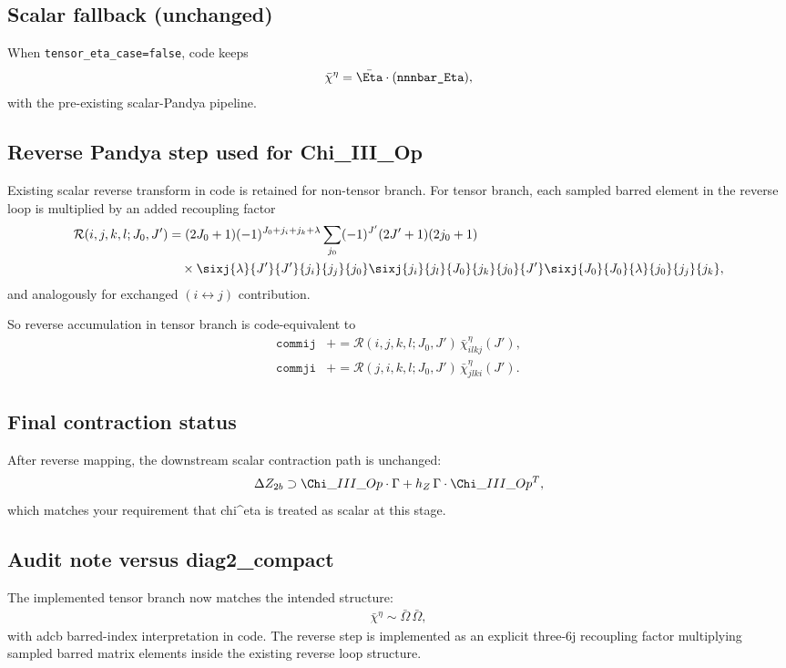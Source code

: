 \subsection*{Scalar fallback (unchanged)}
When \texttt{tensor\_eta\_case=false}, code keeps
\begin{align}
\bar\chi^{\eta} = \bar\Eta\cdot (\texttt{nnnbar\_Eta}),
\end{align}
with the pre-existing scalar-Pandya pipeline.

\subsection*{Reverse Pandya step used for Chi\_III\_Op}
Existing scalar reverse transform in code is retained for non-tensor branch.
For tensor branch, each sampled barred element in the reverse loop is multiplied by
an added recoupling factor
\begin{align}
\mathcal R(i,j,k,l;J_0,J')
&= (2J_0+1)(-1)^{J_0 + j_i + j_k + \lambda}
\sum_{j_0}
(-1)^{J'}(2J'+1)(2j_0+1) \\
&\quad\times
\sixj{\lambda}{J'}{J'}{j_i}{j_j}{j_0}
\sixj{j_i}{j_l}{J_0}{j_k}{j_0}{J'}
\sixj{J_0}{J_0}{\lambda}{j_0}{j_j}{j_k},
\end{align}
and analogously for exchanged $(i\leftrightarrow j)$ contribution.

So reverse accumulation in tensor branch is code-equivalent to
\begin{align}
\texttt{commij} &\mathrel{+}= \mathcal R(i,j,k,l;J_0,J')\,\bar\chi^{\eta}_{i l k j}(J'), \\
\texttt{commji} &\mathrel{+}= \mathcal R(j,i,k,l;J_0,J')\,\bar\chi^{\eta}_{j l k i}(J').
\end{align}

\subsection*{Final contraction status}
After reverse mapping, the downstream scalar contraction path is unchanged:
\begin{align}
\Delta Z_{2b} \supset \Chi\_III\_Op\cdot\Gamma + h_Z\,\Gamma\cdot\Chi\_III\_Op^T,
\end{align}
which matches your requirement that chi^eta is treated as scalar at this stage.

\subsection*{Audit note versus diag2\_compact}
The implemented tensor branch now matches the intended structure:
\begin{align}
\bar\chi^{\eta} \sim \bar\Omega\,\bar\Omega,
\end{align}
with adcb barred-index interpretation in code. The reverse step is implemented as
an explicit three-6j recoupling factor multiplying sampled barred matrix elements
inside the existing reverse loop structure.
